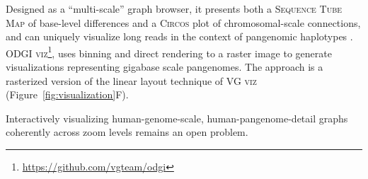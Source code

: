 Designed as a ``multi-scale'' graph browser, it presents both a \textsc{Sequence Tube Map} of base-level differences and a \textsc{Circos} \cite{Krzywinski_2009_Circos} plot of chromosomal-scale connections, and can uniquely visualize long reads in the context of pangenomic haplotypes \cite{yokoyama_momi-g:_2019}.
\textsc{ODGI viz}\footnote{\url{https://github.com/vgteam/odgi}}, uses binning and direct rendering to a raster image to generate visualizations representing gigabase scale pangenomes. %
The approach is a rasterized version of the linear layout technique of \textsc{VG viz} \citep{Garrison_2019} (Figure~\ref{fig:visualization}F). %



Interactively visualizing human-genome-scale, human-pangenome-detail graphs coherently across zoom levels remains an open problem.



%

